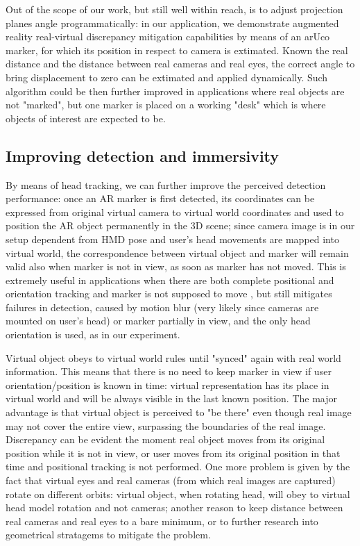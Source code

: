 Out of the scope of our work, but still well within reach, is to adjust projection planes angle programmatically: in our application, we demonstrate augmented reality real-virtual discrepancy mitigation capabilities by means of an arUco marker, for which its position in respect to camera is extimated. Known the real distance and the distance between real cameras and real eyes, the correct angle to bring displacement to zero can be extimated and applied dynamically. Such algorithm could be then further improved in applications where real objects are not "marked", but one marker is placed on a working "desk" which is where objects of interest are expected to be.

\subsection{Improving detection and immersivity}

By means of head tracking, we can further improve the perceived detection performance: once an AR marker is first detected, its coordinates can be expressed from original virtual camera to virtual world coordinates and used to position the AR object permanently in the 3D scene; since camera image is in our setup dependent from HMD pose and user's head movements are mapped into virtual world, the correspondence between virtual object and marker will remain valid also when marker is not in view, as soon as marker has not moved. This is extremely useful in applications when there are both complete positional and orientation tracking and marker is not supposed to move \cite{link_aruco_ogre}, but still mitigates failures in detection, caused by motion blur (very likely since cameras are mounted on user's head) or marker partially in view, and the only head orientation is used, as in our experiment.

Virtual object obeys to virtual world rules until "synced" again with real world information. This means that there is no need to keep marker in view if user orientation/position is known in time: virtual representation has its place in virtual world and will be always visible in the last known position. The major advantage is that virtual object is perceived to "be there" even though real image may not cover the entire view, surpassing the boundaries of the real image. Discrepancy can be evident the moment real object moves from its original position while it is not in view, or user moves from its original position in that time and positional tracking is not performed. One more problem is given by the fact that virtual eyes and real cameras (from which real images are captured) rotate on different orbits: virtual object, when rotating head, will obey to virtual head model rotation and not cameras; another reason to keep distance between real cameras and real eyes to a bare minimum, or to further research into geometrical stratagems to mitigate the problem.

